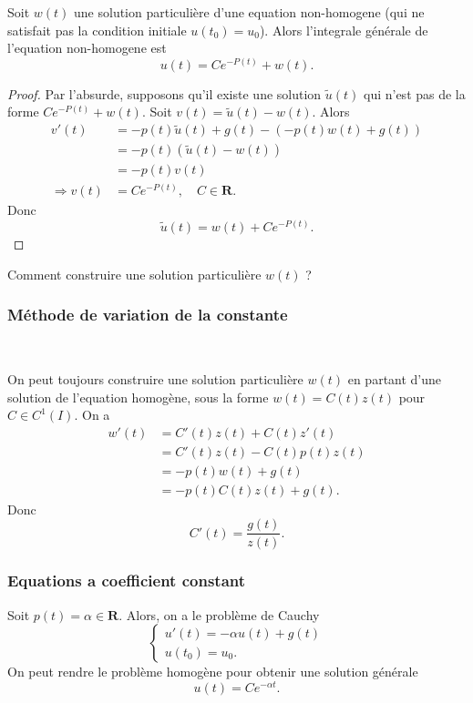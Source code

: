 \begin{proposition}
Soit $w(t)$ une solution particulière d'une equation non-homogene (qui ne satisfait pas la condition initiale $u(t_{0})=u_{0}$). Alors l'integrale générale de l'equation non-homogene est
$$
u(t)=Ce^{ -P(t) }+w(t). 
$$
\end{proposition}
\begin{proof}
Par l'absurde, supposons qu'il existe une solution $\tilde{u}(t)$ qui n'est pas de la forme $Ce^{ -P(t) }+w(t)$. Soit $v(t)=\tilde{u}(t)-w(t)$. Alors 
\begin{align*}
v'(t) & =-p(t)\tilde{u}(t)+g(t)-(-p(t)w(t)+g(t)) \\
 & =-p(t)(\tilde{u}(t)-w(t)) \\
 & =-p(t)v(t) \\
\Rightarrow v(t) & =Ce^{ -P(t) },\quad C\in \mathbf{R}.
\end{align*}
Donc
$$
\tilde{u}(t)=w(t)+Ce^{ -P(t) }.
$$
\end{proof}
\begin{question}
Comment construire une solution particulière $w(t)$ ?
\end{question}
\subsubsection*{Méthode de variation de la constante}\

On peut toujours construire une solution particulière $w(t)$ en partant d'une solution de l'equation homogène, sous la forme $w(t)=C(t)z(t)$ pour $C\in C^{1}(I)$. On a
\begin{align*}
w'(t) & =C'(t)z(t)+C(t)z'(t) \\
 & =C'(t)z(t)-C(t)p(t)z(t) \\
 & =-p(t)w(t)+g(t) \\
 & =-p(t)C(t)z(t)+g(t).
\end{align*}
Donc
$$
C'(t)=\frac{g(t)}{z(t)}.
$$
\subsubsection*{Equations a coefficient constant}
Soit $p(t)=\alpha \in \mathbf{R}$. Alors, on a le problème de Cauchy
$$
\begin{cases}
u'(t) =-\alpha u(t)+g(t) \\
u(t_{0})=u_{0} .
\end{cases}
$$
On peut rendre le problème homogène pour obtenir une solution générale
$$
u(t)=Ce^{ -\alpha t }.
$$
